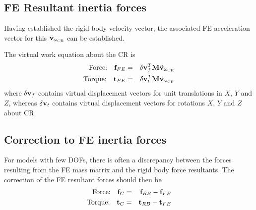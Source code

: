 \subsection{FE Resultant inertia forces}
\label{subs:FE Resultant inertia forces}

Having established the rigid body velocity vector, the associated FE
acceleration vector for this $\ddot{\bf v}_{\omega_{\mbox{\tiny CR}}}$ can be established.

The virtual work equation about the CR is
%
\begin{eqnarray}
\mbox{Force:~~~} {\bf f}_{FE} &=&
\delta{\bf v}_f^T {\bf M} \ddot{\bf v}_{\omega_{\mbox{\tiny CR}}} \label{eq:Ffe} \\
\mbox{Torque:~~~}{\bf t}_{FE} &=&
\delta{\bf v}_t^T {\bf M} \ddot{\bf v}_{\omega_{\mbox{\tiny CR}}}
\end{eqnarray}
%
where $\delta{\bf v}_f$ contains virtual displacement vectors for unit
translations in $X$, $Y$ and $Z$, whereas $\delta{\bf v}_t$ contains virtual
displacement vectors for rotations $X$, $Y$ and $Z$ about CR.

\subsection{Correction to FE inertia forces}
\label{subs:Correction to FE inertia forces}

For models with few DOFs, there is often a discrepancy between the forces
resulting from the FE mass matrix and the rigid body force resultants.
The correction of the FE resultant forces should then be
%
\begin{eqnarray}
\mbox{Force:~~~} {\bf f}_C &=& {\bf f}_{RB} - {\bf f}_{FE} \label{eq:Fc} \\
\mbox{Torque:~~~}{\bf t}_C &=& {\bf t}_{RB} - {\bf t}_{FE} \label{eq:Tc}
\end{eqnarray}

